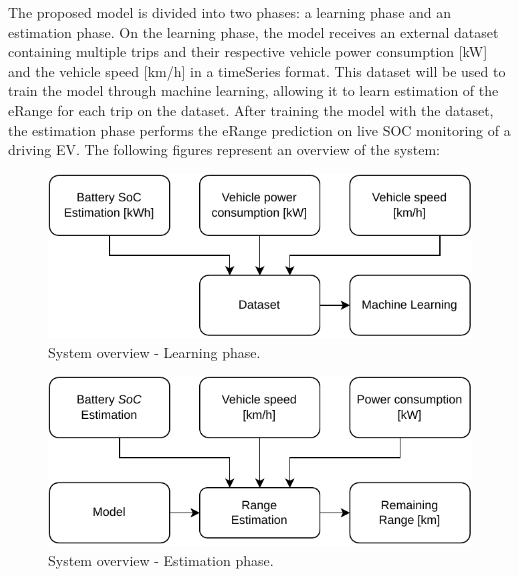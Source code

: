 The proposed model is divided into two phases: 
a learning phase and an estimation phase.
On the learning phase, the model receives 
an external \gls{dataset} containing multiple
trips and their respective vehicle power consumption [kW]
and the vehicle speed [km/h] in a  \gls{timeSeries} format.
This \gls{dataset} will be used to train the model
through machine learning, allowing it to learn estimation of 
the \gls{eRange} for each trip on the \gls{dataset}.
After training the model with the dataset,
the estimation phase performs the \gls{eRange} prediction
on live \gls{SOC} monitoring of a driving \gls{EV}.
The following figures represent an overview of the system:


\begin{figure}[H]
    \begin{center}
        \includegraphics[scale=1.0]{../figures/generic_diagram_learn_phase}
        \caption{System overview - Learning phase.}
    \end{center}
\end{figure}

\begin{figure}[H]
    \begin{center}
        \includegraphics[scale=1.0]{../figures/generic_diagram_estimation_phase}
        \caption{System overview - Estimation phase.}
    \end{center}
\end{figure}